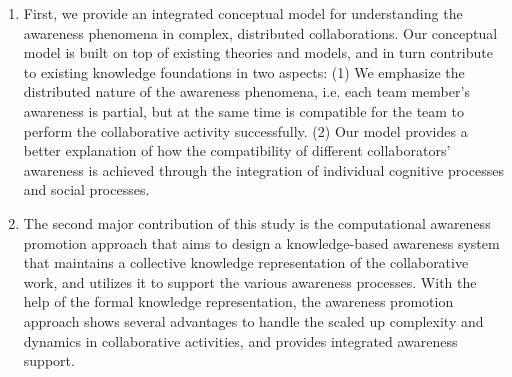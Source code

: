 \begin{enumerate}
	\item First, we provide an integrated conceptual model for understanding the awareness phenomena in complex, distributed collaborations. Our conceptual model is built on top of existing theories and models, and in turn contribute to existing knowledge foundations in two aspects: (1) We emphasize the distributed nature of the awareness phenomena, i.e. each team member's awareness is partial, but at the same time is compatible for the team to perform the collaborative activity successfully. (2) Our model provides a better explanation of how the compatibility of different collaborators' awareness is achieved through the integration of individual cognitive processes and social processes.
	\item The second major contribution of this study is the computational awareness promotion approach that aims to design a knowledge-based awareness system that maintains a collective knowledge representation of the collaborative work, and utilizes it to support the various awareness processes. With the help of the formal knowledge representation, the awareness promotion approach shows several advantages to handle the scaled up complexity and dynamics in collaborative activities, and provides integrated awareness support.
\end{enumerate}

